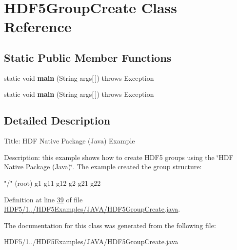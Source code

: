 \hypertarget{class_h_d_f5_group_create}{}\section{H\+D\+F5\+Group\+Create Class Reference}
\label{class_h_d_f5_group_create}
\subsection*{Static Public Member Functions}
\begin{DoxyCompactItemize}
\item 
\mbox{\label{class_h_d_f5_group_create_ad970c72bda39685ad161f4786652132e}} 
static void {\bfseries main} (String args\mbox{[}$\,$\mbox{]})  throws Exception 
\item 
\mbox{\label{class_h_d_f5_group_create_ad970c72bda39685ad161f4786652132e}} 
static void {\bfseries main} (String args\mbox{[}$\,$\mbox{]})  throws Exception 
\end{DoxyCompactItemize}


\subsection{Detailed Description}
Title\+: H\+DF Native Package (Java) Example 

Description\+: this example shows how to create H\+D\+F5 groups using the \char`\"{}\+H\+D\+F Native Package (\+Java)\char`\"{}. The example created the group structure\+:


\begin{DoxyPre}
    "/" (root)
        g1
            g11
            g12
        g2
            g21
            g22
\end{DoxyPre}


Definition at line \hyperlink{_h_d_f5_21_810_81_2_h_d_f5_examples_2_j_a_v_a_2_h_d_f5_group_create_8java_source_l00039}{39} of file \hyperlink{_h_d_f5_21_810_81_2_h_d_f5_examples_2_j_a_v_a_2_h_d_f5_group_create_8java_source}{H\+D\+F5/1../\+H\+D\+F5\+Examples/\+J\+A\+V\+A/\+H\+D\+F5\+Group\+Create.\+java}.



The documentation for this class was generated from the following file\+:\begin{DoxyCompactItemize}
\item 
H\+D\+F5/1../\+H\+D\+F5\+Examples/\+J\+A\+V\+A/\+H\+D\+F5\+Group\+Create.\+java\end{DoxyCompactItemize}
